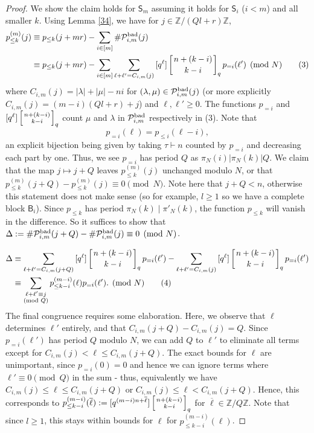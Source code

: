 \documentclass[12pt]{article}
\newcommand{\Z}{\mathbb{Z}}
\newcommand{\qbinom}[2]{\left[{#1 \atop #2}\right]_q}
\begin{document}
\begin{proof}
We show the claim holds for $\mathsf{S}_m$ assuming it holds for $\mathsf{S}_{i}$ ($i<m$) and all smaller $k$. Using Lemma \ref{34}, we have for $j \in \mathbb{Z}/(Ql+r)\mathbb{Z}$,
\begin{align*}
p_{\le k}^{(m)}(j) &\equiv p_{\le k}(j+mr)- \sum_{i\in [m]}{\#\mathcal{P}^{\textup{bad}}_{i,m}(j)} \\
&\equiv p_{\le k}(j+mr)-\sum_{i\in[m]}{\sum_{\ell+\ell' = C_{i,m}(j)}{[q^\ell]\qbinom{n+(k-i)}{k-i}p_{=i}(\ell')}} \pmod{N} \tag{3} \\
\end{align*}
where $C_{i,m}(j) = |\lambda|+|\mu|-ni$ for $(\lambda, \mu) \in \mathcal{P}^{\textup{bad}}_{i,m}(j)$ (or more explicitly $C_{i,m}(j)=(m-i)(Ql+r)+j$) and $\ell, \ell' \ge 0$. The functions $p_{=i}$ and $[q^\ell]\qbinom{n+(k-i)}{k-i}$ count $\mu$ and $\lambda$ in $\mathcal{P}^{\textup{bad}}_{i,m}$ respectively in (3). Note that
\[p_{=i}(\ell) = p_{\le i}(\ell-i),\]
an explicit bijection being given by taking $\tau \vdash n$ counted by $p_{=i}$ and decreasing each part by one. Thus, we see $p_{=i}$ has period $Q$ as $\pi_N(i) | \pi_N(k) | Q$. We claim that the map $j \mapsto j+Q$ leaves $p_{\le k}^{(m)}(j)$ unchanged modulo $N$, or that $p_{\le k}^{(m)}(j+Q)-p_{\le k}^{(m)}(j) \equiv 0 \pmod{N}$. Note here that $j+Q<n$, otherwise this statement does not make sense (so for example, $l \ge 1$ so we have a complete block $\mathsf{B}_i$). Since $p_{\le k}$ has period $\pi_N(k) \mid \pi'_N(k)$, the function $p_{\le k}$ will vanish in the difference. So it suffices to show that $\Delta:=\#\mathcal{P}^{\textup{bad}}_{i,m}(j+Q)-\#\mathcal{P}^{\textup{bad}}_{i,m}(j)\equiv 0 \pmod{N}$.

\begin{align*}\Delta &\equiv {\sum_{\ell+\ell' = C_{i,m}(j+Q)}{[q^\ell]\qbinom{n+(k-i)}{k-i}p_{=i}(\ell')}}-{\sum_{\ell+\ell' = C_{i,m}(j)}{[q^\ell]\qbinom{n+(k-i)}{k-i}p_{=i}(\ell')}}\\
&\equiv \sum_{\substack{\ell+\ell' \equiv j \\ (\textup{mod } Q)}}{p_{\le k-i}^{(m-i)}(\ell)p_{=i}(\ell')}. \pmod{N} \tag{4}
\end{align*}
The final congruence requires some elaboration. Here, we observe that $\ell$ determines $\ell'$ entirely, and that $C_{i,m}(j+Q)-C_{i,m}(j)=Q$. Since $p_{=i}(\ell')$ has period $Q$ modulo $N$, we can add $Q$ to $\ell'$ to eliminate all terms except for $C_{i,m}(j)< \ell \le C_{i,m}(j+Q)$. The exact bounds for $\ell$ are unimportant, since $p_{=i}(0)=0$ and hence we can ignore terms where $\ell'\equiv 0 \pmod{Q}$ in the sum - thus, equivalently we have $C_{i,m}(j)\le \ell \le C_{i,m}(j+Q)$ or $C_{i,m}(j)\le \ell < C_{i,m}(j+Q)$. Hence, this corresponds to $p_{\le k-i}^{(m-i)}(\overline{\ell}):=[q^{(m-i)n+\overline{\ell}}]\qbinom{n+(k-i)}{k-i}$ for $\overline{\ell}\in \Z/Q\Z$. Note that since $l\ge 1$, this stays within bounds for $\ell$ for $p_{\le k-i}^{(m-i)}(\ell)$.


\end{proof}
\end{document}
